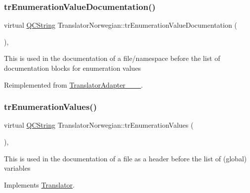 \mbox{\label{class_translator_norwegian_a8a78fa35b2c327c01b83fc6632a846f8}} 
\subsubsection{\texorpdfstring{trEnumerationValueDocumentation()}{trEnumerationValueDocumentation()}}
{\footnotesize\ttfamily virtual \mbox{\hyperlink{class_q_c_string}{Q\+C\+String}} Translator\+Norwegian\+::tr\+Enumeration\+Value\+Documentation (\begin{DoxyParamCaption}{ }\end{DoxyParamCaption})\hspace{0.3cm}{\ttfamily [inline]}, {\ttfamily [virtual]}}

This is used in the documentation of a file/namespace before the list of documentation blocks for enumeration values 

Reimplemented from \mbox{\hyperlink{class_translator_adapter__1__4__6}{Translator\+Adapter\+\_\+\_\+\_}}.

\mbox{\label{class_translator_norwegian_a25ce99a57816bd75886f407659c237e3}} 
\subsubsection{\texorpdfstring{trEnumerationValues()}{trEnumerationValues()}}
{\footnotesize\ttfamily virtual \mbox{\hyperlink{class_q_c_string}{Q\+C\+String}} Translator\+Norwegian\+::tr\+Enumeration\+Values (\begin{DoxyParamCaption}{ }\end{DoxyParamCaption})\hspace{0.3cm}{\ttfamily [inline]}, {\ttfamily [virtual]}}

This is used in the documentation of a file as a header before the list of (global) variables 

Implements \mbox{\hyperlink{class_translator}{Translator}}.

\mbox{\label{class_translator_norwegian_a04e9862bef83ebecd84588fe34f3c246}} 
